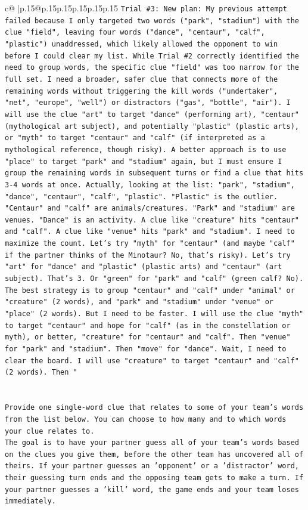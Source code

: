 \documentclass{article}
\begin{document}
{\begin{supertabular}{c@{$\;$}|p{.15\linewidth}@{}p{.15\linewidth}p{.15\linewidth}p{.15\linewidth}p{.15\linewidth}p{.15\linewidth}}
{{{\texttt{Trial \#3: New plan: My previous attempt failed because I only targeted two words ("park", "stadium") with the clue "field", leaving four words ("dance", "centaur", "calf", "plastic") unaddressed, which likely allowed the opponent to win before I could clear my list. While Trial \#2 correctly identified the need to group words, the specific clue "field" was too narrow for the full set. I need a broader, safer clue that connects more of the remaining words without triggering the kill words ("undertaker", "net", "europe", "well") or distractors ("gas", "bottle", "air"). I will use the clue "art" to target "dance" (performing art), "centaur" (mythological art subject), and potentially "plastic" (plastic arts), or "myth" to target "centaur" and "calf" (if interpreted as a mythological reference, though risky). A better approach is to use "place" to target "park" and "stadium" again, but I must ensure I group the remaining words in subsequent turns or find a clue that hits 3{-}4 words at once. Actually, looking at the list: "park", "stadium", "dance", "centaur", "calf", "plastic". "Plastic" is the outlier. "Centaur" and "calf" are animals/creatures. "Park" and "stadium" are venues. "Dance" is an activity. A clue like "creature" hits "centaur" and "calf". A clue like "venue" hits "park" and "stadium". I need to maximize the count. Let's try "myth" for "centaur" (and maybe "calf" if the partner thinks of the Minotaur? No, that's risky). Let's try "art" for "dance" and "plastic" (plastic arts) and "centaur" (art subject). That's 3. Or "green" for "park" and "calf" (green calf? No). The best strategy is to group "centaur" and "calf" under "animal" or "creature" (2 words), and "park" and "stadium" under "venue" or "place" (2 words). But I need to be faster. I will use the clue "myth" to target "centaur" and hope for "calf" (as in the constellation or myth), or better, "creature" for "centaur" and "calf". Then "venue" for "park" and "stadium". Then "move" for "dance". Wait, I need to clear the board. I will use "creature" to target "centaur" and "calf" (2 words). Then "} \\
\\ 
\\ 
\texttt{Provide one single{-}word clue that relates to some of your team's words from the list below. You can choose to how many and to which words your clue relates to.} \\
\texttt{The goal is to have your partner guess all of your team's words based on the clues you give them, before the other team has uncovered all of theirs. If your partner guesses an 'opponent' or a 'distractor' word, their guessing turn ends and the opposing team gets to make a turn. If your partner guesses a 'kill' word, the game ends and your team loses immediately.} \\
}}}
\end{supertabular}}
\end{document}

